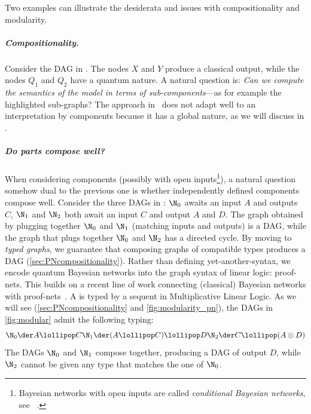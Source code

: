 Two examples can illustrate the desiderata and issues with compositionality and modularity.

\subparagraph{Compositionality.}

Consider the DAG in .
The nodes $X$ and $Y$ produce a classical output, while the nodes $Q_1$ and $Q_2$ have a quantum nature.
A natural question is:
\emph{Can we compute the semantics of the model in terms of sub-components}---as for example the highlighted sub-graphs? 
The approach in~\cite{GBN2014} does not adapt well to an interpretation by components because it has a global nature, as we will discuss in .

\subparagraph{Do parts compose well?}

When considering components (possibly with open inputs\footnote{Bayesian networks with open inputs are called \emph{conditional Bayesian networks}, see \eg~\cite{KollerBook}.}), a natural question somehow dual to the previous one is whether independently defined components compose well.
Consider the three DAGs in : $\N_0$ awaits an input $A$ and outputs $C$, $\N_1$ and $\N_2$ both await an input $C$ and output $A$ and $D$.
The graph obtained by plugging together $\N_0$ and $\N_1$ (matching inputs and outputs) is a DAG, while the graph that plugs together $\N_0$ and $\N_2$ has a directed cycle.
By moving to \emph{typed graphs}, we guarantee that composing graphs of compatible types produces a DAG (\cref{sec:PNcompositionality}).
Rather than defining yet-another-syntax, we encode quantum Bayesian networks into the graph syntax of linear logic: proof-nets.
This builds on a recent line of work connecting (classical) Bayesian networks with proof-nets~\cite{EhrhardFP23,popl24,BPN}.
A \pn is typed by a sequent in Multiplicative Linear Logic.
As we will see (\cref{sec:PNcompositionality} and \cref{fig:modularity_pn}), the DAGs in \cref{fig:modular} admit the following typing:
\begin{equation*}
\hfill \N_0\der A\lollipop C \hfill \N_1\der (A\lollipop C)\lollipop D \hfill \N_2\der C \lollipop (A \otimes D) \hfill
\end{equation*}
The DAGs $\N_0$ and $\N_1$ compose together, producing a DAG of output $D$, while $\N_2$ cannot be given any type that matches the one of $\N_0$.

